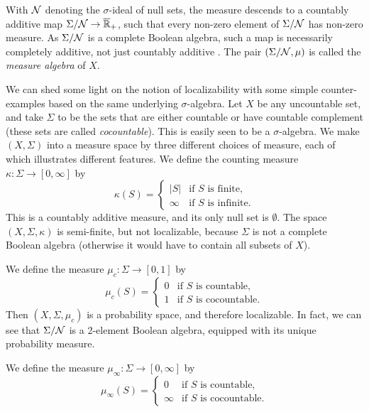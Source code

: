 \documentclass[reqno,T1]{amsproc}
\newcommand{\Rplusext}{\overline{\mathbb{R}}_+} %
\theoremstyle{plain}
\theoremstyle{remark}
\numberwithin{equation}{section}
\begin{document}
With $\mathcal{N}$ denoting the $\sigma$-ideal of null sets, the measure descends to a countably additive map $\Sigma / \Null \to \Rplusext$, such that every non-zero element of $\Sigma / \mathcal{N}$ has non-zero measure. As $\Sigma / \mathcal{N}$ is a complete Boolean algebra, such a map is necessarily completely additive, not just countably additive \cite[321E]{fremlin2}. The pair $(\Sigma/\mathcal{N}, \mu)$ is called the \emph{measure algebra} of $X$. 

We can shed some light on the notion of localizability with some simple counter-examples based on the same underlying $\sigma$-algebra. Let $X$ be any uncountable set, and take $\Sigma$ to be the sets that are either countable or have countable complement (these sets are called \emph{cocountable}). This is easily seen to be a $\sigma$-algebra. We make $(X,\Sigma)$ into a measure space by three different choices of measure, each of which illustrates different features. We define the counting measure $\kappa : \Sigma \rightarrow [0,\infty]$ by
\begin{equation}
\label{CountingMeasDefnEqn}
\kappa(S) = \begin{cases} |S| & \text{if } S \text{ is finite}, \\
                          \infty & \text{if } S \text{ is infinite}. \end{cases}
\end{equation}
This is a countably additive measure, and its only null set is $\emptyset$. The space $(X,\Sigma,\kappa)$ is semi-finite, but not localizable, because $\Sigma$ is not a complete Boolean algebra (otherwise it would have to contain all subsets of $X$). 

We define the measure $\mu_c : \Sigma \rightarrow [0,1]$ by
\begin{equation}
\label{CountableCocountableMeasDefnEqn}
\mu_c(S) = \begin{cases} 0 & \text{if } S \text{ is countable}, \\
                         1 & \text{if } S \text{ is cocountable}. \end{cases}
\end{equation}
Then $(X,\Sigma,\mu_c)$ is a probability space, and therefore localizable. In fact, we can see that $\Sigma/ \mathcal{N}$ is a 2-element Boolean algebra, equipped with its unique probability measure. 

We define the measure $\mu_\infty : \Sigma \rightarrow [0,\infty]$ by
\[
\mu_\infty(S) = \begin{cases} 0 & \text{if } S \text{ is countable}, \\
                             \infty & \text{if } S \text{ is cocountable}. \end{cases}
\]
\end{document}
